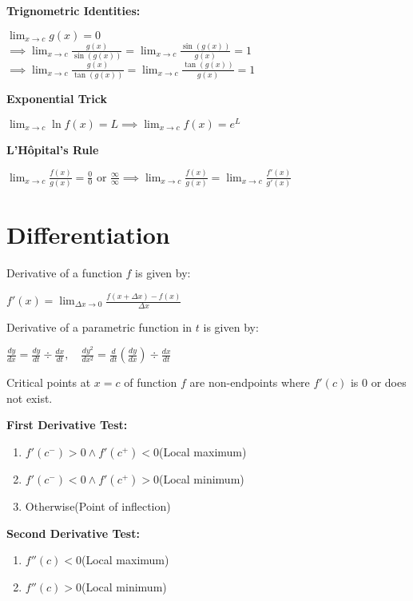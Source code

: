\documentclass[12pt, a4paper]{article}
\begin{document}
\begin{multicols*}{3}
\textbf{Trignometric Identities:}\\
{\centering
  $\displaystyle\lim_{x\rightarrow c}g(x) = 0$\\
  $\implies \displaystyle \lim_{x\rightarrow c} \frac{g(x)}{\sin(g(x))} = \lim_{x\rightarrow c} \frac{\sin(g(x))}{g(x)} = 1$
  $\implies \displaystyle \lim_{x\rightarrow c} \frac{g(x)}{\tan(g(x))} = \lim_{x\rightarrow c} \frac{\tan(g(x))}{g(x)} = 1$
\par}

\textbf{Exponential Trick}\\
{\centering
  $\displaystyle \lim_{x\rightarrow c}\ln f(x) = L \implies \lim_{x\rightarrow c}f(x) = e^{L}$
\par}

\textbf{L'Hôpital's Rule}\\
{\centering
  $\displaystyle \lim_{x\rightarrow c}\frac{f(x)}{g(x)} = \frac{0}{0} \text{ or } \frac{\infty}{\infty}\implies \lim_{x\rightarrow c}\frac{f(x)}{g(x)} = \lim_{x\rightarrow c}\frac{f'(x)}{g'(x)}$
\par}
\colbreak

\section{Differentiation}
Derivative of a function $f$ is given by:\\
{\centering
  $\displaystyle f'(x) = \lim_{\Delta x\rightarrow 0} \frac{f(x+\Delta x)-f(x)}{\Delta x}$
\par}
\vspace{-0.5em}
Derivative of a parametric function in $t$ is given by:\\
{\centering
  $\displaystyle \frac{dy}{dx} = \frac{dy}{dt} \div \frac{dx}{dt},\quad \frac{dy^2}{dx^2} = \frac{d}{dt}(\frac{dy}{dx}) \div \frac{dx}{dt}$
\par}

Critical points at $x=c$ of function $f$ are non-endpoints where $f'(c)$ is $0$ or does not exist.

\textbf{First Derivative Test:}
\begin{enumerate}[\roman*.]
  \item $f'(c^-) > 0 \land f'(c^+)<0$\hfill(Local maximum)
  \item $f'(c^-) < 0 \land f'(c^+)>0$\hfill(Local minimum)
  \item Otherwise\hfill(Point of inflection)
\end{enumerate}

\textbf{Second Derivative Test:}
\begin{enumerate}[\roman*.]
  \item $f''(c)<0$\hfill(Local maximum)
  \item $f''(c)>0$\hfill(Local minimum)
\end{enumerate}


\end{multicols*}
\end{document}
